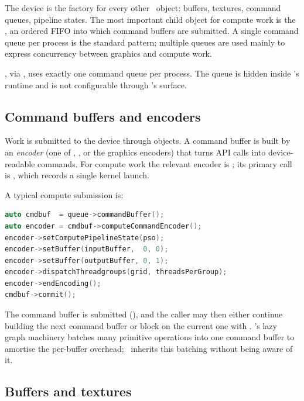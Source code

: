 The device is the factory for every other \Metal\ object: buffers,
textures, command queues, pipeline states. The most important child
object for compute work is the , an ordered
FIFO into which command buffers are submitted. A single command
queue per process is the standard pattern; multiple queues are used
mainly to express concurrency between graphics and compute work.

\Lucid, via \MLX, uses exactly one command queue per process. The
queue is hidden inside \MLX's runtime and is not configurable
through \Lucid's surface.

\subsection{Command buffers and encoders}
\label{ssec:metal_mpsgraph:command_buffers}

Work is submitted to the device through 
objects. A command buffer is built by an \emph{encoder} (one of
, , or
the graphics encoders) that turns API calls into device-readable
commands. For compute work the relevant encoder is
; its primary call is
, which records
a single kernel launch.

A typical compute submission is:

\begin{lstlisting}[style=lucidcpp,language=C++]
auto cmdbuf  = queue->commandBuffer();
auto encoder = cmdbuf->computeCommandEncoder();
encoder->setComputePipelineState(pso);
encoder->setBuffer(inputBuffer,  0, 0);
encoder->setBuffer(outputBuffer, 0, 1);
encoder->dispatchThreadgroups(grid, threadsPerGroup);
encoder->endEncoding();
cmdbuf->commit();
\end{lstlisting}

The command buffer is submitted (), and the caller may
then either continue building the next command buffer or block on
the current one with . \MLX's lazy graph
machinery batches many primitive operations into one command buffer
to amortise the per-buffer overhead; \Lucid\ inherits this batching
without being aware of it.

\subsection{Buffers and textures}
\label{ssec:metal_mpsgraph:buffers}

